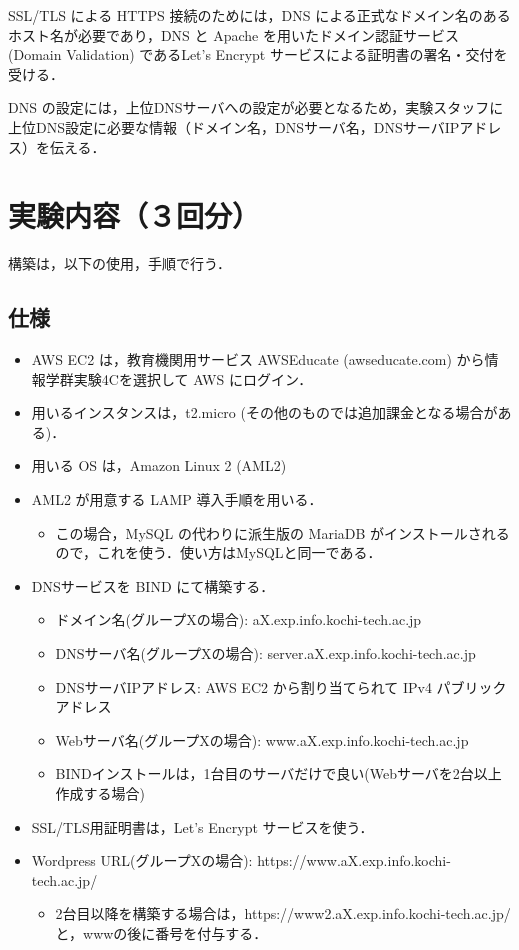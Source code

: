 SSL/TLS による HTTPS 接続のためには，DNS による正式なドメイン名のあるホスト名が必要であり，DNS と Apache を用いたドメイン認証サービス (Domain Validation) であるLet's Encrypt サービスによる証明書の署名・交付を受ける．

DNS の設定には，上位DNSサーバへの設定が必要となるため，実験スタッフに上位DNS設定に必要な情報（ドメイン名，DNSサーバ名，DNSサーバIPアドレス）を伝える．

\section{実験内容（３回分）}

構築は，以下の使用，手順で行う．

\subsection{仕様}

\begin{itemize}
    \item AWS EC2 は，教育機関用サービス AWSEducate (awseducate.com) から情報学群実験4Cを選択して AWS にログイン．
    \item 用いるインスタンスは，t2.micro (その他のものでは追加課金となる場合がある)．
    \item 用いる OS は，Amazon Linux 2 (AML2)
    \item AML2 が用意する LAMP 導入手順を用いる．
    \begin{itemize}
        \item この場合，MySQL の代わりに派生版の MariaDB がインストールされるので，これを使う．使い方はMySQLと同一である．
    \end{itemize}
    \item DNSサービスを BIND にて構築する．
    \begin{itemize}
        \item ドメイン名(グループXの場合): aX.exp.info.kochi-tech.ac.jp
        \item DNSサーバ名(グループXの場合): server.aX.exp.info.kochi-tech.ac.jp
        \item DNSサーバIPアドレス: AWS EC2 から割り当てられて IPv4 パブリックアドレス
        \item Webサーバ名(グループXの場合): www.aX.exp.info.kochi-tech.ac.jp
        \item BINDインストールは，1台目のサーバだけで良い(Webサーバを2台以上作成する場合)
    \end{itemize}    
    \item SSL/TLS用証明書は，Let's Encrypt サービスを使う．
    \item Wordpress URL(グループXの場合): https://www.aX.exp.info.kochi-tech.ac.jp/
    \begin{itemize}
        \item 2台目以降を構築する場合は，https://www2.aX.exp.info.kochi-tech.ac.jp/ と，wwwの後に番号を付与する．
    \end{itemize}
\end{itemize}

